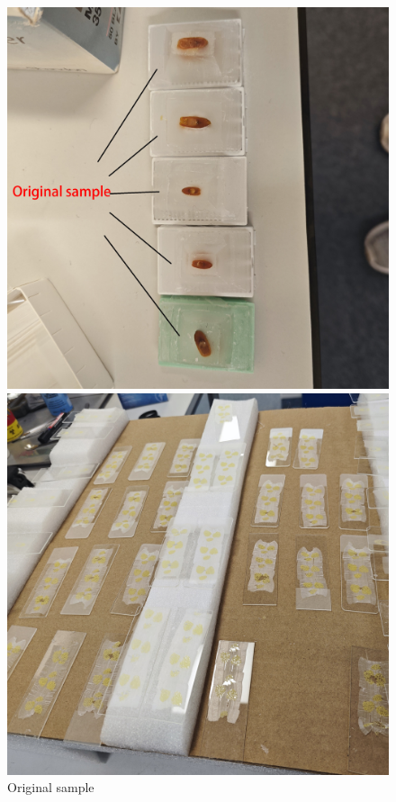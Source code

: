 
\begin{figure}[H]
    \centering
    \begin{minipage}{0.3\textwidth}
        \centering
        \includegraphics[width=\textwidth]{./fig/sample - 副本.jpg}
        \caption{Original sample}
        \label{label:sample}
    \end{minipage}
    \begin{minipage}{0.3\textwidth}
        \centering
        \includegraphics[width=\textwidth]{./fig/采集样本.jpg}

\end{minipage}
\end{figure}
